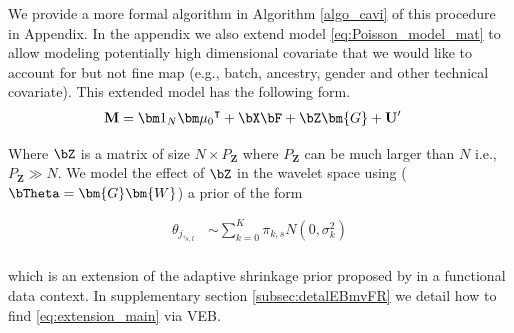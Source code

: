 We provide a more formal algorithm in Algorithm \ref{algo_cavi} of this procedure in Appendix. In the appendix we also  extend model \ref{eq:Poisson_model_mat} to allow modeling potentially high dimensional covariate that we would like to account for but not fine map (e.g., batch, ancestry, gender and other technical covariate). This extended model has the following form.  
 \begin{align}  \label{eq:extension_main}
   \mathbf{  M }  &= {\bm 1}_N {\bm\mu_0}^{\intercal} +    \bX\bF + \bZ\bm{G} +\mathbf{ U}' 
 \end{align}

 Where $\bZ$ is a matrix of size  $N\times P_{\bm Z}$ where $P_{\bm Z}$ can be much  larger than $N$ i.e.,$P_{\bm Z}\gg N$.  We model the effect of $\bZ$ in the wavelet space using ($\bTheta= \bm{G} \bm{W}$) a prior of the form 



 \begin{align}
    \theta_{j,_{ s,l}} &  \sim \sum_{k=0}^K \pi_{k ,s} N(0,\sigma_{k }^2)\\
\end{align}

which is an extension of the adaptive shrinkage prior proposed by \cite{kim_flexible_2022} in a functional data context. In supplementary section \ref{subsec:detalEBmvFR} we detail how to find \ref{eq:extension_main} via VEB. 



 
 

